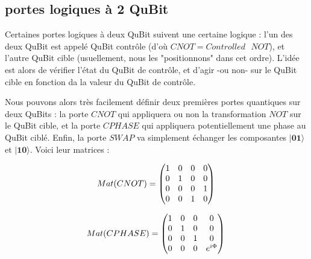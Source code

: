 \documentclass[a4paper,12pt]{report}
\newcommand{\quSt}[1]{\bm{|#1\rangle}}
\begin{document}
		\subsection{portes logiques à 2 QuBit}

\par{
	Certaines portes logiques à deux QuBit suivent une certaine logique : l'un des deux QuBit est appelé QuBit contrôle (d'où $CNOT = Controlled \text{ } NOT$), et l'autre QuBit cible (usuellement, nous les "positionnons" dans cet ordre). L'idée est alors de vérifier l'état du QuBit de contrôle, et d'agir -ou non- sur le QuBit cible en fonction da la valeur du QuBit de contrôle.
}

\vspace{1\baselineskip}

\par{
	Nous pouvons alors très facilement définir deux premières portes quantiques sur deux QuBits : la porte $CNOT$ qui appliquera ou non la transformation $NOT$ sur le QuBit cible, et la porte $CPHASE$ qui appliquera potentiellement une phase au QuBit ciblé. Enfin, la porte $SWAP$ va simplement échanger les composantes $\quSt{01}$ et $\quSt{10}$. Voici leur matrices :
}

\begin{equation}
	 Mat(CNOT) = \left( \begin{matrix} 1 & 0 & 0 & 0 \\ 0 & 1 & 0 & 0 \\ 0 & 0 & 0 & 1 \\ 0 & 0 & 1 & 0 \\ \end{matrix} \right ) \\
\end{equation}

\vspace{1\baselineskip}

\begin{equation}
	 Mat(CPHASE) = \left( \begin{matrix} 1 & 0 & 0 & 0 \\ 0 & 1 & 0 & 0 \\ 0 & 0 & 1 & 0 \\ 0 & 0 & 0 & e^{i\Phi} \\ \end{matrix} \right ) \\
\end{equation}

\vspace{1\baselineskip}
\end{document}

